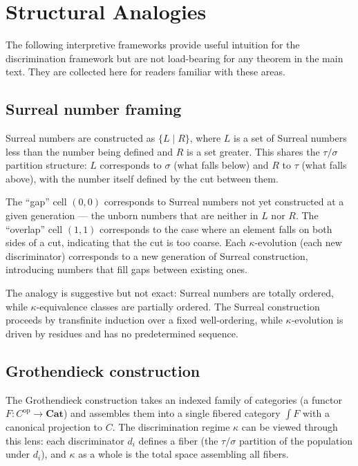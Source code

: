 \section{Structural Analogies}\label{app:analogies}

The following interpretive frameworks provide useful
intuition for the discrimination framework but are not
load-bearing for any theorem in the main text. They are
collected here for readers familiar with these areas.

\subsection{Surreal number framing}

Surreal numbers are constructed as $\{L \mid R\}$, where
$L$ is a set of Surreal numbers less than the number being
defined and $R$ is a set greater. This shares the
$\tau/\sigma$ partition structure: $L$ corresponds to
$\sigma$ (what falls below) and $R$ to $\tau$ (what falls
above), with the number itself defined by the cut between
them.

The ``gap'' cell $(0,0)$ corresponds to Surreal numbers
not yet constructed at a given generation --- the unborn
numbers that are neither in $L$ nor $R$. The ``overlap''
cell $(1,1)$ corresponds to the case where an element
falls on both sides of a cut, indicating that the cut
is too coarse. Each $\kappa$-evolution (each new
discriminator) corresponds to a new generation of Surreal
construction, introducing numbers that fill gaps between
existing ones.

The analogy is suggestive but not exact: Surreal numbers
are totally ordered, while $\kappa$-equivalence classes
are partially ordered. The Surreal construction proceeds
by transfinite induction over a fixed well-ordering,
while $\kappa$-evolution is driven by residues and has
no predetermined sequence.

\subsection{Grothendieck construction}

The Grothendieck construction takes an indexed family of
categories (a functor $F: C^{\mathrm{op}} \to \mathbf{Cat}$)
and assembles them into a single fibered category $\int F$
with a canonical projection to $C$. The discrimination
regime $\kappa$ can be viewed through this lens: each
discriminator $d_i$ defines a fiber (the $\tau/\sigma$
partition of the population under $d_i$), and $\kappa$
as a whole is the total space assembling all fibers.

